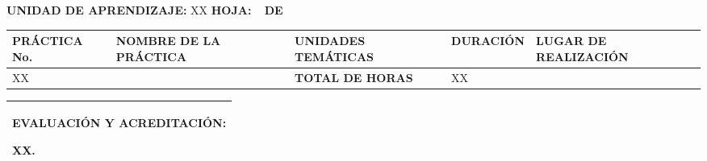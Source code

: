 \documentclass[10pt]{article}
\newcommand\tab[1][1cm]{\hspace*{#1}}
\begin{document}
\textbf{UNIDAD DE APRENDIZAJE:} XX
\tab[1cm]
\textbf{HOJA: } \thepage\
\tab[0.25cm]
\textbf{DE } \pageref{LastPage}\\
\begin{center}
\end{center}
\begin{table}[H]
  \begin{tabular}{|p{}|p{}|p{}|p{}|p{}|}
    \hline
    \Centering\textbf{PRÁCTICA No.} & \Centering\textbf{NOMBRE DE LA PRÁCTICA} & \Centering\textbf{UNIDADES TEMÁTICAS} & \Centering\textbf{DURACIÓN} & \Centering\textbf{LUGAR DE REALIZACIÓN}\\
    \hline 
    XX
    \hline &&\Centering\textbf{TOTAL DE HORAS}& XX &\\\hline 
  \end{tabular}
  \begin{tabular}{|p{1.045\textwidth}|}
    \textbf{EVALUACIÓN Y ACREDITACIÓN:}

    XX.\\\hline
  \end{tabular}
\end{table}


\end{document}

